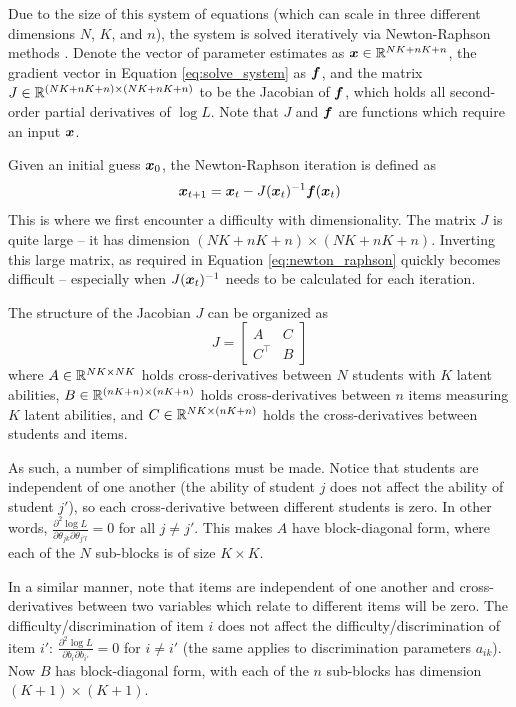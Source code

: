 Due to the size of this system of equations (which can scale in three different dimensions $N$, $K$, and $n$), the system is solved iteratively via Newton-Raphson methods \cite{ben_israel1966}. Denote the vector of parameter estimates as $\boldsymbol{x} \in \mathbb{R}^{NK+nK+n}$, the gradient vector in Equation \ref{eq:solve_system} as $\boldsymbol{f}$, and the matrix $J\in \mathbb{R}^{(NK + nK +n) \times(NK + nK + n)}$ to be the Jacobian of $\boldsymbol{f}$, which holds all second-order partial derivatives of $\log L$. Note that $J$ and $\boldsymbol{f}$ are functions which require an input $\boldsymbol{x}$.

Given an initial guess $\boldsymbol{x}_0$, the Newton-Raphson iteration is defined as
\begin{equation}
  \boldsymbol{x}_{t+1} = \boldsymbol{x}_t - J(\boldsymbol{x}_t)^{-1} \boldsymbol{f}(\boldsymbol{x}_t)
  \label{eq:newton_raphson}
\end{equation}
This is where we first encounter a difficulty with dimensionality. The matrix $J$ is quite large -- it has dimension $(NK+nK+n) \times (NK+nK+n)$. Inverting this large matrix, as required in Equation \ref{eq:newton_raphson} quickly becomes difficult -- especially when $J(\boldsymbol{x}_t)^{-1}$ needs to be calculated for each iteration.

The structure of the Jacobian $J$ can be organized as
\begin{equation}
  J = \begin{bmatrix}
    A & C \\
    C^\top & B
  \end{bmatrix}
  \label{eq:jacobian_blocks}
\end{equation}
where $A \in \mathbb{R}^{NK \times NK}$ holds cross-derivatives between $N$ students with $K$ latent abilities, $B \in \mathbb{R}^{(nK+n) \times (nK+n)}$ holds cross-derivatives between $n$ items measuring $K$ latent abilities, and $C \in \mathbb{R}^{NK \times (nK+n)}$ holds the cross-derivatives between students and items.

As such, a number of simplifications must be made. Notice that students are independent of one another (the ability of student $j$ does not affect the ability of student $j'$), so each cross-derivative between different students is zero. In other words, $\displaystyle\frac{\partial^2 \log L}{\partial\theta_{j k} \partial \theta_{j' l}} = 0$ for all $j \not= j'$. This makes $A$ have block-diagonal form, where each of the $N$ sub-blocks is of size $K\times K$. 

In a similar manner, note that items are independent of one another and cross-derivatives between two variables which relate to different items will be zero. The difficulty/discrimination of item $i$ does not affect the difficulty/discrimination of item $i'$: $\displaystyle\frac{\partial^2 \log L}{\partial b_{i} \partial b_{i'}} = 0$ for $i \not = i'$ (the same applies to discrimination parameters $a_{ik}$). Now $B$ has block-diagonal form, with each of the $n$ sub-blocks has dimension $(K+1) \times (K+1)$. 

